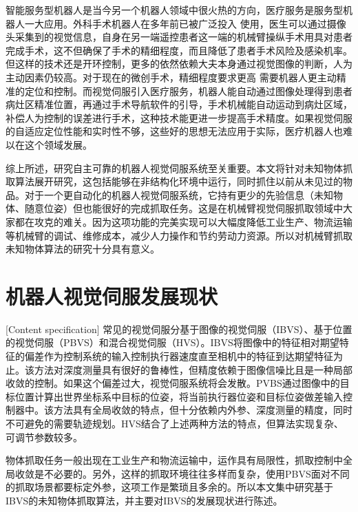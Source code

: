 \documentclass[fontset=fandol,type=bachelor,campus=harbin,bsmainpagenumberline=true]{hithesisbook}
\begin{document}
智能服务型机器人是当今另一个机器人领域中很火热的方向，医疗服务是服务型机器人一大应用。外科手术机器人在多年前已被广泛投入
使用，医生可以通过摄像头采集到的视觉信息，自身在另一端遥控患者这一端的机械臂操纵手术用具对患者完成手术，这不但确保了手术的精细程度，而且降低了患者手术风险及感染机率\cite{机器人视觉伺服研究进展}。
但这样的技术还是开环控制，更多的依然依赖大夫本身通过视觉图像的判断，人为主动因素仍较高\cite{外文1,外文2}。对于现在的微创手术，精细程度要求更高
需要机器人更主动精准的定位和控制。而视觉伺服引入医疗服务，机器人能自动通过图像处理得到患者病灶区精准位置，再通过手术导航软件的引导，手术机械能自动运动到病灶区域，补偿人为控制的误差进行手术\cite{卢钰2016基于双目磁锚定手术机器人无标定视觉伺服控制研究}，这种技术能更进一步提高手术精度。如果视觉伺服的自适应定位性能和实时性不够，这些好的思想无法应用于实际，医疗机器人也难以在这个领域发展。


综上所述，研究自主可靠的机器人视觉伺服系统至关重要。本文将针对未知物体抓取算法展开研究，这包括能够在非结构化环境中运行，同时抓住以前从未见过的物品。对于一个更自动化的机器人视觉伺服系统，它持有更少的先验信息（未知物体、随意位姿）但也能很好的完成抓取任务。这是在机械臂视觉伺服抓取领域中大家都在攻克的难关。因为这项功能的完美实现可以大幅度降低工业生产、物流运输等机械臂的调试、维修成本，减少人力操作和节约劳动力资源。所以对机械臂抓取未知物体算法的研究十分具有意义。


\section{机器人视觉伺服发展现状}[Content specification]
常见的视觉伺服分基于图像的视觉伺服（IBVS）、基于位置的视觉伺服（PBVS）和混合视觉伺服（HVS）。IBVS将图像中的特征相对期望特征的偏差作为控制系统的输入控制执行器速度直至相机中的特征到达期望特征为止。该方法对深度测量具有很好的鲁棒性，但精度依赖于图像信噪比且是一种局部收敛的控制。如果这个偏差过大，视觉伺服系统将会发散。PVBS通过图像中的目标位置计算出世界坐标系中目标的位姿，将当前执行器位姿和目标位姿做差输入控制器中。该方法具有全局收敛的特点，但十分依赖内外参、深度测量的精度，同时不可避免的需要轨迹规划。HVS结合了上述两种方法的特点，但算法实现复杂、可调节参数较多。


物体抓取任务一般出现在工业生产和物流运输中，运作具有局限性，抓取控制中全局收敛是不必要的。另外，这样的抓取环境往往多样而复杂，使用PBVS面对不同的抓取场景都要标定外参，这项工作是繁琐且多余的。所以本文集中研究基于IBVS的未知物体抓取算法，并主要对IBVS的发展现状进行陈述。
\end{document}
